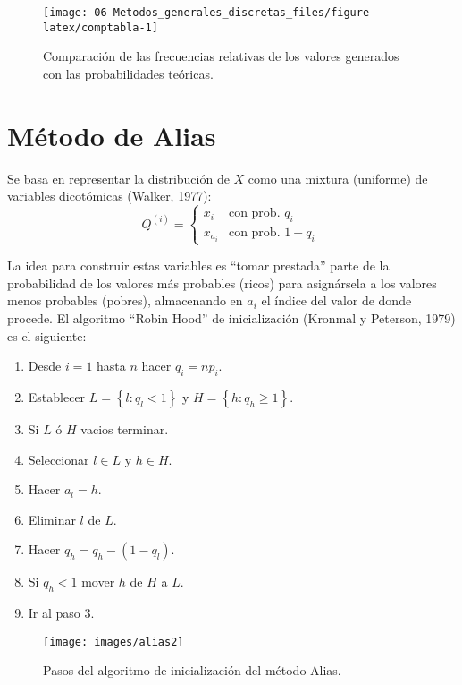 \documentclass[
]{book}
\theoremstyle{break}
\theoremstyle{definition}
\theoremstyle{definition}
\theoremstyle{definition}
\theoremstyle{remark}
\begin{document}
\begin{figure}[!htb]

{\centering \texttt{[image: 06-Metodos\_generales\_discretas\_files/figure-latex/comptabla-1]} 

}

\caption{Comparación de las frecuencias relativas de los valores generados con las probabilidades teóricas.}\label{fig:comptabla}
\end{figure}

\hypertarget{alias}{%
\section{Método de Alias}\label{alias}}

Se basa en representar la distribución de \(X\) como una mixtura
(uniforme) de variables dicotómicas (Walker, 1977):
\[Q^{(i)}=\left\{ 
\begin{array}{ll}
x_{i} & \text{con prob. } q_{i} \\ 
x_{a_{i}} & \text{con prob. } 1-q_{i}
\end{array}
\ \right.\]

La idea para construir estas variables es ``tomar prestada'' parte de la probabilidad de los valores más probables (ricos) para asignársela a los valores menos probables (pobres), almacenando en \(a_i\) el índice del valor de donde procede.
El algoritmo ``Robin Hood'' de inicialización (Kronmal y Peterson, 1979) es el siguiente:

\begin{enumerate}
\def\labelenumi{\arabic{enumi}.}
\item
  Desde \(i=1\) hasta \(n\) hacer \(q_{i}=np_{i}\).
\item
  Establecer \(L=\left\{ l:q_{l}<1\right\}\) y
  \(H=\left\{ h:q_{h}\geq 1\right\}\).
\item
  Si \(L\) ó \(H\) vacios terminar.
\item
  Seleccionar \(l\in L\) y \(h\in H\).
\item
  Hacer \(a_{l}=h\).
\item
  Eliminar \(l\) de \(L\).
\item
  Hacer \(q_{h}=q_{h}-\left( 1-q_{l}\right)\).
\item
  Si \(q_{h}<1\) mover \(h\) de \(H\) a \(L\).
\item
  Ir al paso 3.
\end{enumerate}

\begin{figure}[!htb]

{\centering \texttt{[image: images/alias2]} 

}

\caption{Pasos del algoritmo de inicialización del método Alias.}\label{fig:unnamed-chunk-20}
\end{figure}
\end{document}
